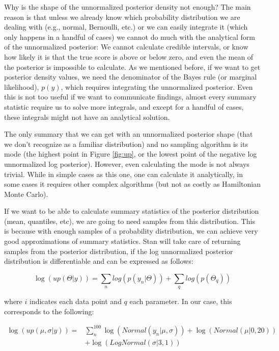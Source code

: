 \documentclass[12pt,]{krantz}
\theoremstyle{definition}
\theoremstyle{definition}
\theoremstyle{definition}
\theoremstyle{remark}
\begin{document}
Why is the shape of the unnormalized posterior density not enough? The main reason is that unless we already know which probability distribution we are dealing with (e.g., normal, Bernoulli, etc.) or we can easily integrate it (which only happens in a handful of cases) we cannot do much with the analytical form of the unnormalized posterior: We cannot calculate credible intervals, or know how likely it is that the true score is above or below zero, and even the mean of the posterior is impossible to calculate.
As we mentioned before, if we want to get posterior density values, we need the denominator of the Bayes rule (or marginal likelihood), \(p(y)\), which requires integrating the unnormalized posterior. Even this is not too useful if we want to communicate findings, almost every summary statistic require us to solve more integrals, and except for a handful of cases, these integrals might not have an analytical solution.

The only summary that we can get with an unnormalized posterior shape (that we don't recognize as a familiar distribution) and no sampling algorithm is its mode (the highest point in Figure \ref{fig:up}, or the lowest point of the negative log unnormalized log posterior). However, even calculating the mode is not always trivial. While in simple cases as this one, one can calculate it analytically, in some cases it requires other complex algorithms (but not as costly as Hamiltonian Monte Carlo).

If we want to be able to calculate summary statistics of the posterior distribution (mean, quantiles, etc), we are going to need samples from this distribution. This is because with enough samples of a probability distribution, we can achieve very good approximations of summary statistics. Stan will take care of returning samples from the posterior distribution, if the log unnormalized posterior distribution is differentiable and can be expressed as follows:

\begin{equation}
\log(up(\Theta|y)) = \sum_n log(p(y_n|\Theta)) + \sum_q log(p(\Theta_q))
\label{eq:logup}
\end{equation}

where \(i\) indicates each data point and \(q\) each parameter. In our case, this corresponds to the following:

\begin{equation}
\begin{aligned}
\log(up(\mu, \sigma |y)) =& \sum_n^{100} \log(Normal(y_n|\mu, \sigma)) + \log(Normal(\mu | 0, 20)) \\
&+ \log(LogNormal(\sigma | 3, 1)) 
\end{aligned}
\label{eq:up-applied}
\end{equation}
\end{document}
